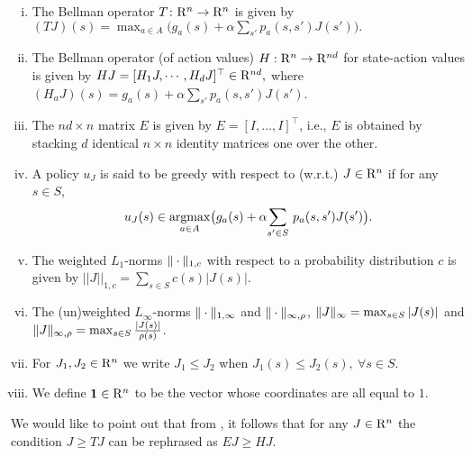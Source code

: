 \begin{definition}\label{notations}
\begin{comment}
Let $c,\rho,\chi:S \to \R_+$ be positive valued functions, where $\R_+$ denotes the set of strictly positive reals. Then for $J\in \R^n$, $a\in A$ and $s\in S$,
define
\end{comment}
\begin{enumerate}[(i)]
\item\label{bellopval} The Bellman operator $T\colon \mathrm{R}^n \rightarrow \mathrm{R}^n$ is given by $(TJ)(s)=\max_{a \in A}\big(g_a(s)+\alpha \sum_{s'} p_a(s,s')J(s')\big).
$
\item \label{bellactval} The Bellman operator (of action values) $H: \mathrm{R}^n \to \mathrm{R}^{nd}$ for state-action values is given by $HJ=[ H_1 J,\cdots,H_d J]^\top\in \mathrm{R}^{nd},$ where $(H_a J)(s)= g_a(s)+\alpha \sum_{s'}p_a(s,s') J(s')$.
\item\label{emat} The $nd\times n$ matrix $E$ is given by $E=[I,\ldots,I]^\top$, i.e., $E$ is obtained by stacking $d$ identical $n\times n$ identity matrices one over the other.
\item\label{greedy} A policy $u_J$ is said to be greedy with respect to (w.r.t.) $J\in \mathrm{R}^n$ if for any $s\in S$,
\begin{align*} u_J(s)\in\underset{a\in A}{\operatorname{argmax}}\big(g_a(s)+\alpha \underset{s'\in S}{\sum}~ p_a(s,s')J(s')\big).\end{align*}
\item\label{norms} The weighted $L_1$-norms $\|\cdot\|_{1,c}$ with respect to a probability distribution $c$ is given by $
||J||_{1,c}=\sum_{s \in S} c(s)|J(s)|$.
\item The (un)weighted $L_\infty$-norms $\|\cdot\|_{1,\infty}$
and $\|\cdot\|_{\infty,\rho}$, $\|J\|_{\infty}=\max_{s\in S}|J(s)|$ and $\|J\|_{\infty,\rho}=\max_{s \in S} \frac{|J(s)|}{\rho(s)}$.
\item For $J_1, J_2\in \mathrm{R}^n$ we write $J_1\leq J_2$ when $J_1(s)\leq J_2(s),~\forall s\in S$.
\item We define $\mathbf{1}\in \mathrm{R}^n$ to be the vector whose coordinates are all equal to $1$.
\end{enumerate}
\end{definition}
We would like to point out that from , it follows that for any $J\in \mathrm{R}^n$ the condition $J\geq TJ$ can be rephrased as $EJ\geq HJ$.

